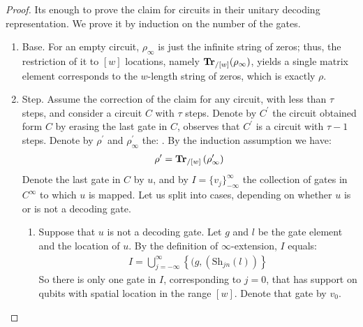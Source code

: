 \begin{proof}
  Its enough to prove the claim for circuits in their unitary decoding representation. We prove it by induction on the number of the gates.

  \begin{enumerate}
    \item Base. For an empty circuit, $\rho_{\infty}$ is just the infinite string of zeros; thus, the restriction of it to $[w]$ locations, namely $ \mathbf{Tr}{}_{/[w]}( \rho_{\infty} ) $, yields a single matrix element corresponds to the $w$-length string of zeros, which is exactly $\rho$.
    \item Step. Assume the correction of the claim for any circuit, with less than $\tau$ steps, and consider a circuit $C$ with $\tau$ steps. Denote by $C^{\prime}$ the circuit obtained form $C$ by erasing the last gate in $C$, observes that $C^{\prime}$ is a circuit with $\tau - 1$ steps. Denote by $\rho^{\prime}$ and $\rho^{\prime}_{\infty}$ the: .  
      By the induction assumption we have:
  \begin{equation*}
    \begin{split}
      \rho^{\prime} =  \mathbf{Tr}{}_{/[w]}\left( \rho^{\prime}_{\infty} \right) 
    \end{split}
  \end{equation*}
Denote the last gate in $C$ by $u$, and by $I = \{v_{j}\}_{-\infty}^{\infty}$ the collection of gates in $C^{\infty}$ to which $u$ is mapped. Let us split into cases, depending on whether $u$ is or is not a decoding gate.
  \begin{enumerate}
    \item Suppose that $u$ is not a decoding gate. Let $g$ and $l$ be the gate element and the location of $u$. By the definition of $\infty$-extension, $I$ equals:
      \begin{equation*}
        \begin{split}
              I = \bigcup_{j = -\infty}^{\infty}\left\{ (g,( \text{Sh}_{jn}(l)) \right\}
        \end{split}
      \end{equation*}
      So there is only one gate in $I$, corresponding to $j=0$, that has support on qubits with spatial location in the range $[w]$. Denote that gate by $v_{0}$. 


\end{enumerate}
\end{enumerate}
\end{proof}
